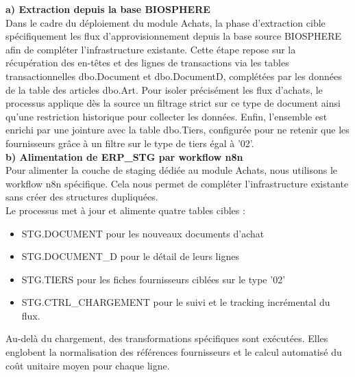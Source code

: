 \textbf{a)	Extraction depuis la base BIOSPHERE}\\
Dans le cadre du déploiement du module Achats, la phase d'extraction cible spécifiquement les flux d'approvisionnement depuis la base source BIOSPHERE afin de compléter l'infrastructure existante. Cette étape repose sur la récupération des en-têtes et des lignes de transactions via les tables transactionnelles dbo.Document et dbo.DocumentD, complétées par les données de la table des articles dbo.Art. Pour isoler précisément les flux d'achats, le processus applique dès la source un filtrage strict sur ce type de document ainsi qu'une restriction historique pour collecter les données. Enfin, l'ensemble est enrichi par une jointure avec la table dbo.Tiers, configurée pour ne retenir que les fournisseurs grâce à un filtre sur le type de tiers égal à '02'.\\

\textbf{b)	Alimentation de ERP\_STG par workflow n8n}\\
Pour alimenter la couche de staging dédiée au module Achats, nous utilisons le workflow n8n spécifique. Cela nous permet de compléter l'infrastructure existante sans créer des structures dupliquées.\\
Le processus met à jour et alimente quatre tables cibles :
\begin{itemize}
    \item STG.DOCUMENT pour les nouveaux documents d'achat
    \item STG.DOCUMENT\_D pour le détail de leurs lignes
    \item STG.TIERS pour les fiches fournisseurs ciblées sur le type '02'
    \item STG.CTRL\_CHARGEMENT pour le suivi et le tracking incrémental du flux.
\end{itemize}
Au-delà du chargement, des transformations spécifiques sont exécutées. Elles englobent la normalisation des références fournisseurs et le calcul automatisé du coût unitaire moyen pour chaque ligne.\\

